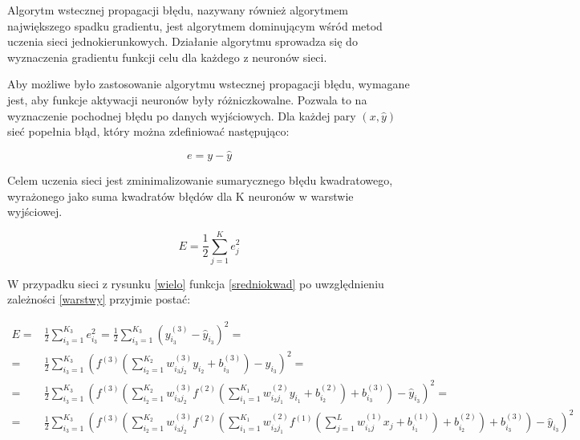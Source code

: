 \documentclass[12pt,twoside]{article}
\begin{document}
Algorytm wstecznej propagacji błędu, nazywany również algorytmem największego spadku gradientu, jest algorytmem dominującym wśród metod uczenia sieci jednokierunkowych. Działanie algorytmu sprowadza się do wyznaczenia gradientu funkcji celu dla każdego z neuronów sieci. 

Aby możliwe było zastosowanie algorytmu wstecznej propagacji błędu, wymagane jest, aby funkcje aktywacji neuronów były różniczkowalne. Pozwala to na wyznaczenie pochodnej błędu po danych wyjściowych. Dla każdej pary $(x, \hat{y})$ sieć popełnia błąd, który można zdefiniować następująco:

\begin{equation}
e = y - \hat{y}
\end{equation}

Celem uczenia sieci jest zminimalizowanie sumarycznego błędu kwadratowego, wyrażonego jako suma kwadratów błędów dla K neuronów w warstwie wyjściowej.

\begin{equation}\label{sredniokwad}
E = \frac{1}{2} \sum_{j=1}^{K} e_{j}^2
\end{equation}

W przypadku sieci z rysunku \ref{wielo} funkcja \ref{sredniokwad} po uwzględnieniu zależności \ref{warstwy} przyjmie postać:

\begin{equation}
\begin{aligned}
E =& \frac{1}{2} \sum_{i_{3}=1}^{K_{3}} e_{i_{3}}^2 = \frac{1}{2} \sum_{i_{3}=1}^{K_{3}}\left( y_{i_{3}}^{(3)} - \hat{y}_{i_{3}} \right)^2 =\\
 =& \frac{1}{2} \sum_{i_{3}=1}^{K_{3}} \left( f^{(3)}\left( \sum_{i_{2}=1}^{K_{2}} w_{i_{3}j_{2}}^{(3)}y_{i_{2}} + b_{i_{3}}^{(3)} \right) - \hat{y}_{i_{3}} \right)^2 =\\
=& \frac{1}{2} \sum_{i_{3}=1}^{K_{3}} \left( f^{(3)}\left( \sum_{i_{2}=1}^{K_{2}} w_{i_{3}j_{2}}^{(3)} f^{(2)}\left( \sum_{i_{1}=1}^{K_{1}} w_{i_{2}j_{1}}^{(2)} y_{i_{1}} + b_{i_{2}}^{(2)} \right) + b_{i_{3}}^{(3)} \right) - \hat{y}_{i_{3}} \right)^2 =\\
=& \frac{1}{2} \sum_{i_{3}=1}^{K_{3}} \left( f^{(3)}\left( \sum_{i_{2}=1}^{K_{2}} w_{i_{3}j_{2}}^{(3)} f^{(2)}\left( \sum_{i_{1}=1}^{K_{1}} w_{i_{2}j_{1}}^{(2)} f^{(1)}\left( \sum_{j=1}^{L} w_{i_{1}j}^{(1)} x_{j} + b_{i_{1}}^{(1)} \right) + b_{i_{2}}^{(2)} \right) + b_{i_{3}}^{(3)} \right) - \hat{y}_{i_{3}} \right)^2 
\end{aligned}
\end{equation}\\
\end{document}
